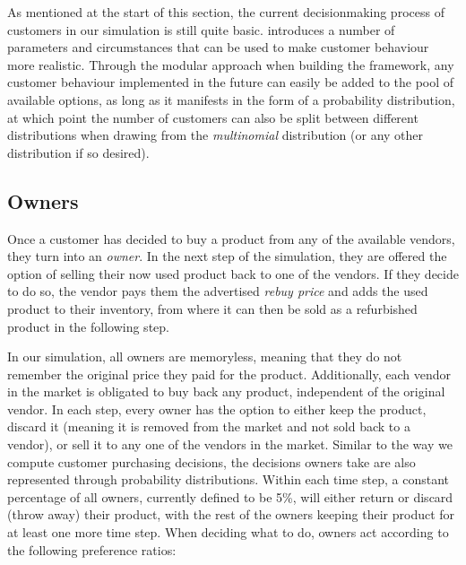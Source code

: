As mentioned at the start of this section, the current decisionmaking process of customers in our simulation is still quite basic.  introduces a number of parameters and circumstances that can be used to make customer behaviour more realistic. Through the modular approach when building the framework, any customer behaviour implemented in the future can easily be added to the pool of available options, as long as it manifests in the form of a probability distribution, at which point the number of customers can also be split between different distributions when drawing from the \emph{multinomial} distribution (or any other distribution if so desired).

\subsection{Owners}

Once a customer has decided to buy a product from any of the available vendors, they turn into an \emph{owner}. In the next step of the simulation, they are offered the option of selling their now used product back to one of the vendors. If they decide to do so, the vendor pays them the advertised \emph{rebuy price} and adds the used product to their inventory, from where it can then be sold as a refurbished product in the following step.

In our simulation, all owners are memoryless, meaning that they do not remember the original price they paid for the product. Additionally, each vendor in the market is obligated to buy back any product, independent of the original vendor. In each step, every owner has the option to either keep the product, discard it (meaning it is removed from the market and not sold back to a vendor), or sell it to any one of the vendors in the market. Similar to the way we compute customer purchasing decisions, the decisions owners take are also represented through probability distributions. Within each time step, a constant percentage of all owners, currently defined to be 5\%, will either return or discard (throw away) their product, with the rest of the owners keeping their product for at least one more time step. When deciding what to do, owners act according to the following preference ratios:

